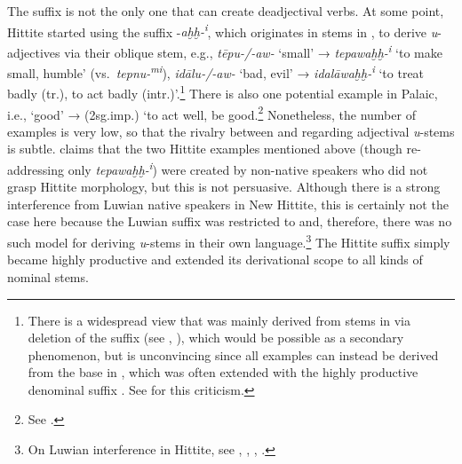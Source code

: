 \documentclass[output=paper,colorlinks,citecolor=brown]{langscibook}
\begin{document}
The suffix  is not the only one that can create deadjectival verbs. At some point, Hittite started using the  suffix -\textit{aḫḫ-\textsuperscript{i}}, which originates in stems in , to derive \textit{u}-adjectives via their oblique stem, e.g., \textit{tēpu-/-aw-} ‘small’ → \textit{tepawaḫḫ-\textsuperscript{i}} ‘to make small, humble’ (vs.\ \textit{tepnu-\textsuperscript{mi}}), \textit{idālu-/-aw-} ‘bad, evil’ → \textit{idalāwaḫḫ-\textsuperscript{i}} ‘to treat badly (tr.), to act badly (intr.)’.\footnote{There is a widespread view that  was mainly derived from stems in  via deletion of the suffix (see \citealt[240--241]{Oettinger1979}, \citealt[147]{Vanseveren2014}), which would be possible as a secondary phenomenon, but is unconvincing  since all examples can instead be derived from the base in , which was often extended with the highly productive denominal suffix . See \citealt[284--285]{Sasseville2015} for this criticism.} There is also one potential example in Palaic, i.e.,  ‘good’ →  (2sg.imp.) ‘to act well, be good.\footnote{See \citealt[536, fn.\ 8]{Sasseville2021}.} Nonetheless, the number of examples is very low, so that the rivalry between  and  regarding adjectival \textit{u}-stems is subtle. \citet[282]{Shatskov2020} claims that the two Hittite examples mentioned above (though re-addressing only \textit{tepawaḫḫ-\textsuperscript{i}}) were created by non-native speakers who did not grasp  Hittite morphology, but this is not persuasive. Although there is a strong interference from Luwian native speakers in New Hittite, this is certainly not the case here because the Luwian  suffix was restricted to  and, therefore, there was no such model for deriving \textit{u}-stems in their own language.\footnote{On Luwian interference in Hittite, see \citealt{Melchert2005}, \citealt{Rieken2006}, \citealt{Hout2006}, \citealt[15--73]{Yakubovich2010}.} The Hittite  suffix  simply became highly productive and extended its derivational scope to all kinds of nominal stems.
\end{document}
